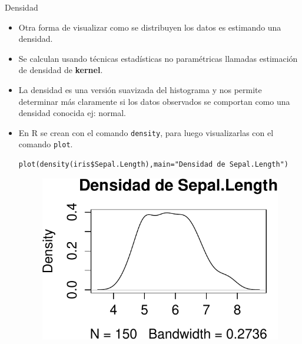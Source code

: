\documentclass[handout]{beamer}
\begin{document}
\begin{frame}[fragile]{Densidad }
\scriptsize{
\begin{itemize}
 \item Otra forma de visualizar como se distribuyen los datos es estimando una densidad.
 \item Se calculan usando técnicas estadísticas no paramétricas llamadas estimación de densidad de \textbf{kernel}.
 \item La densidad es una versión suavizada del histograma y nos permite determinar más claramente si los datos observados se comportan como una densidad conocida ej: normal. 
 \item En R se crean con el comando \verb+density+, para luego visualizarlas con el comando \verb+plot+.

 \begin{verbatim}
plot(density(iris$Sepal.Length),main="Densidad de Sepal.Length")
 \end{verbatim}
 \begin{figure}[h!]
	\centering
	\includegraphics[scale=0.5]{pics/density.pdf}
	
	
\end{figure} 

\end{itemize}




}
\end{frame}
\end{document}
